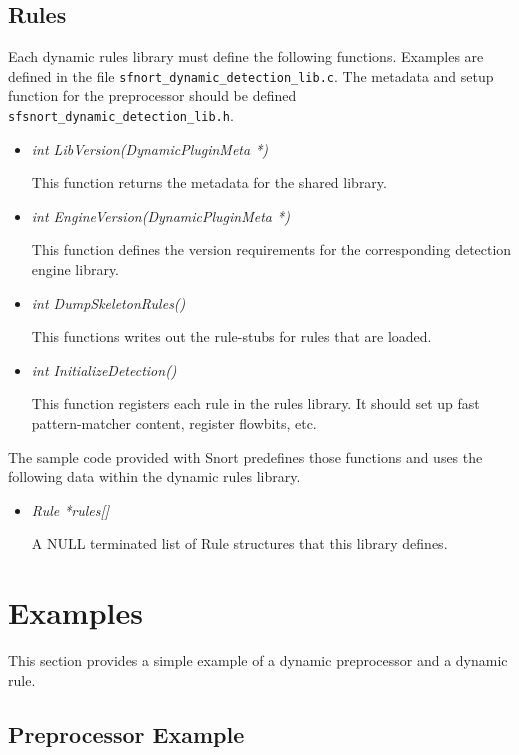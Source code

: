 \documentclass[english]{report}
\begin{document}
\subsection{Rules}

Each dynamic rules library must define the following functions.
Examples are defined in the file \texttt{sfnort\_dynamic\_detection\_lib.c}.
The metadata and setup function for the preprocessor should be defined
\texttt{sfsnort\_dynamic\_detection\_lib.h}.

\begin{itemize}
\item {\em int LibVersion(DynamicPluginMeta *)}

This function returns the metadata for the shared library.

\item {\em int EngineVersion(DynamicPluginMeta *)}

This function defines the version requirements for the corresponding
detection engine library.

\item {\em int DumpSkeletonRules()}

This functions writes out the rule-stubs for rules that are loaded.

\item {\em int InitializeDetection()}

This function registers each rule in the rules library.  It should
set up fast pattern-matcher content, register flowbits, etc.
\end{itemize}

The sample code provided with Snort predefines those functions 
and uses the following data within the dynamic rules library.

\begin{itemize}

\item {\em Rule *rules[]}

A NULL terminated list of Rule structures that this library defines.

\end{itemize}

\section{Examples}

This section provides a simple example of a dynamic preprocessor
and a dynamic rule.

\subsection{Preprocessor Example}
\end{document}
